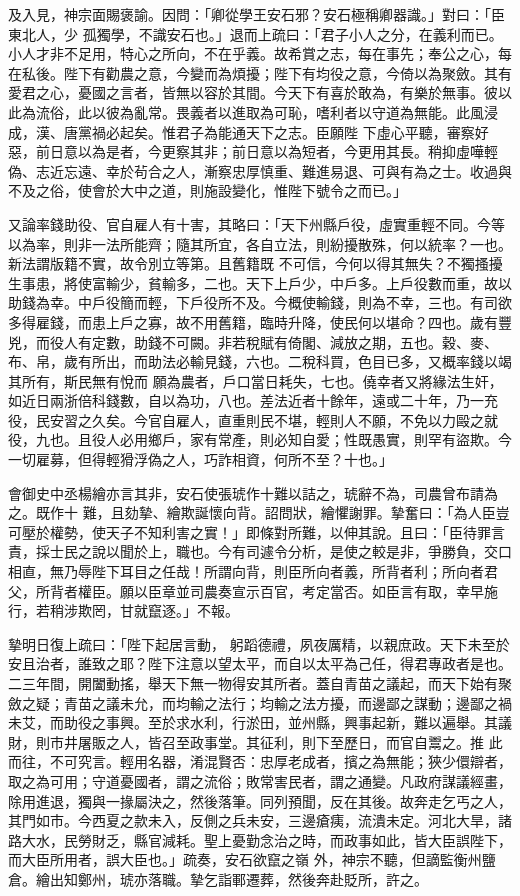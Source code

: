 \begin{pinyinscope}
 及入見，神宗面賜褒諭。因問：「卿從學王安石邪？安石極稱卿器識。」對曰：「臣東北人，少
 孤獨學，不識安石也。」退而上疏曰：「君子小人之分，在義利而已。小人才非不足用，特心之所向，不在乎義。故希賞之志，每在事先；奉公之心，每在私後。陛下有勸農之意，今變而為煩擾；陛下有均役之意，今倚以為聚斂。其有愛君之心，憂國之言者，皆無以容於其間。今天下有喜於敢為，有樂於無事。彼以此為流俗，此以彼為亂常。畏義者以進取為可恥，嗜利者以守道為無能。此風浸成，漢、唐黨禍必起矣。惟君子為能通天下之志。臣願陛
 下虛心平聽，審察好惡，前日意以為是者，今更察其非；前日意以為短者，今更用其長。稍抑虛嘩輕偽、志近忘遠、幸於茍合之人，漸察忠厚慎重、難進易退、可與有為之士。收過與不及之俗，使會於大中之道，則施設變化，惟陛下號令之而已。」



 又論率錢助役、官自雇人有十害，其略曰：「天下州縣戶役，虛實重輕不同。今等以為率，則非一法所能齊；隨其所宜，各自立法，則紛擾散殊，何以統率？一也。新法謂版籍不實，故令別立等第。且舊籍既
 不可信，今何以得其無失？不獨搔擾生事患，將使富輸少，貧輸多，二也。天下上戶少，中戶多。上戶役數而重，故以助錢為幸。中戶役簡而輕，下戶役所不及。今概使輸錢，則為不幸，三也。有司欲多得雇錢，而患上戶之寡，故不用舊籍，臨時升降，使民何以堪命？四也。歲有豐兇，而役人有定數，助錢不可闕。非若稅賦有倚閣、減放之期，五也。穀、麥、布、帛，歲有所出，而助法必輸見錢，六也。二稅科買，色目已多，又概率錢以竭其所有，斯民無有悅而
 願為農者，戶口當日耗失，七也。僥幸者又將緣法生奸，如近日兩浙倍科錢數，自以為功，八也。差法近者十餘年，遠或二十年，乃一充役，民安習之久矣。今官自雇人，直重則民不堪，輕則人不願，不免以力毆之就役，九也。且役人必用鄉戶，家有常產，則必知自愛；性既愚實，則罕有盜欺。今一切雇募，但得輕猾浮偽之人，巧詐相資，何所不至？十也。」



 會御史中丞楊繪亦言其非，安石使張琥作十難以詰之，琥辭不為，司農曾布請為之。既作十
 難，且劾摯、繪欺誕懷向背。詔問狀，繪懼謝罪。摯奮曰：「為人臣豈可壓於權勢，使天子不知利害之實！」即條對所難，以伸其說。且曰：「臣待罪言責，採士民之說以聞於上，職也。今有司遽令分析，是使之較是非，爭勝負，交口相直，無乃辱陛下耳目之任哉！所謂向背，則臣所向者義，所背者利；所向者君父，所背者權臣。願以臣章並司農奏宣示百官，考定當否。如臣言有取，幸早施行，若稍涉欺罔，甘就竄逐。」不報。



 摯明日復上疏曰：「陛下起居言動，
 躬蹈德禮，夙夜厲精，以親庶政。天下未至於安且治者，誰致之耶？陛下注意以望太平，而自以太平為己任，得君專政者是也。二三年間，開闔動搖，舉天下無一物得安其所者。蓋自青苗之議起，而天下始有聚斂之疑；青苗之議未允，而均輸之法行；均輸之法方擾，而邊鄙之謀動；邊鄙之禍未艾，而助役之事興。至於求水利，行淤田，並州縣，興事起新，難以遍舉。其議財，則市井屠販之人，皆召至政事堂。其征利，則下至歷日，而官自鬻之。推
 此而往，不可究言。輕用名器，淆混賢否：忠厚老成者，擯之為無能；狹少儇辯者，取之為可用；守道憂國者，謂之流俗；敗常害民者，謂之通變。凡政府謀議經畫，除用進退，獨與一掾屬決之，然後落筆。同列預聞，反在其後。故奔走乞丐之人，其門如市。今西夏之款未入，反側之兵未安，三邊瘡痍，流潰未定。河北大旱，諸路大水，民勞財乏，縣官減耗。聖上憂勤念治之時，而政事如此，皆大臣誤陛下，而大臣所用者，誤大臣也。」疏奏，安石欲竄之嶺
 外，神宗不聽，但謫監衡州鹽倉。繪出知鄭州，琥亦落職。摯乞詣鄆遷葬，然後奔赴貶所，許之。




\end{pinyinscope}
